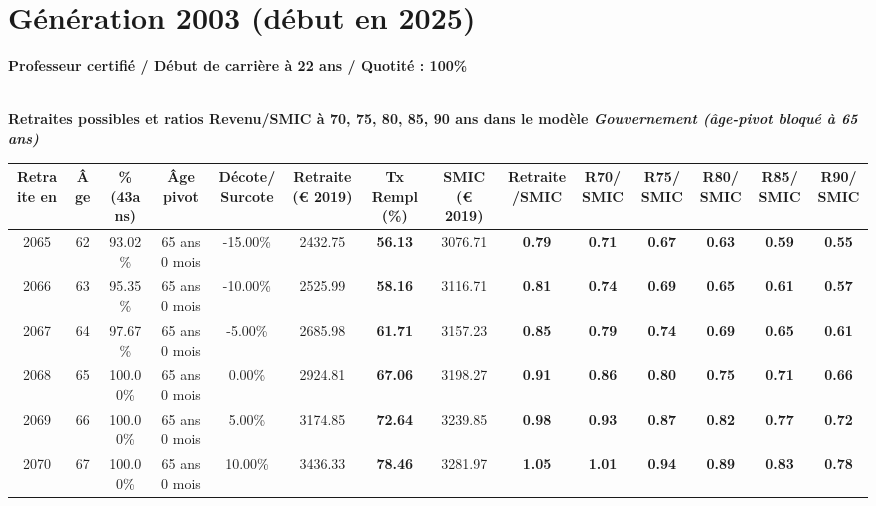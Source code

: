 \newpage 
 
\section{Génération 2003 (début en 2025)\label{ProfCertifie_100_2003_22_0}} 
 
{\bf \noindent Professeur certifié / Début de carrière à 22 ans / Quotité : 100\%}  ~ 

 ~\\{\bf \noindent Retraites possibles et ratios Revenu/SMIC à 70, 75, 80, 85, 90 ans dans le modèle \emph{Gouvernement (âge-pivot bloqué à 65 ans)}}  
 
\begin{adjustbox}{max width=\textwidth} 
\begin{tabular}[htb]{|c|c||c|c|c||c|c||c|c||c|c|c|c|c|} 
\hline 
 Retraite en &  Âge &  \%(43ans) &  Âge pivot &  Décote/Surcote &  Retraite (\euro{} 2019) &  Tx Rempl(\%) &  SMIC (\euro{} 2019) &  Retraite/SMIC &  R70/SMIC &  R75/SMIC &  R80/SMIC &  R85/SMIC &  R90/SMIC \\ 
\hline \hline 
 2065 &  62 &  93.02\% &  65 ans 0 mois &  -15.00\% &  2432.75 &  {\bf 56.13} &  3076.71 &  {\bf {\color{red} 0.79}} &  {\bf {\color{red} 0.71}} &  {\bf {\color{red} 0.67}} &  {\bf {\color{red} 0.63}} &  {\bf {\color{red} 0.59}} &  {\bf {\color{red} 0.55}} \\ 
\hline 
 2066 &  63 &  95.35\% &  65 ans 0 mois &  -10.00\% &  2525.99 &  {\bf 58.16} &  3116.71 &  {\bf {\color{red} 0.81}} &  {\bf {\color{red} 0.74}} &  {\bf {\color{red} 0.69}} &  {\bf {\color{red} 0.65}} &  {\bf {\color{red} 0.61}} &  {\bf {\color{red} 0.57}} \\ 
\hline 
 2067 &  64 &  97.67\% &  65 ans 0 mois &  -5.00\% &  2685.98 &  {\bf 61.71} &  3157.23 &  {\bf {\color{red} 0.85}} &  {\bf {\color{red} 0.79}} &  {\bf {\color{red} 0.74}} &  {\bf {\color{red} 0.69}} &  {\bf {\color{red} 0.65}} &  {\bf {\color{red} 0.61}} \\ 
\hline 
 2068 &  65 &  100.00\% &  65 ans 0 mois &  0.00\% &  2924.81 &  {\bf 67.06} &  3198.27 &  {\bf {\color{red} 0.91}} &  {\bf {\color{red} 0.86}} &  {\bf {\color{red} 0.80}} &  {\bf {\color{red} 0.75}} &  {\bf {\color{red} 0.71}} &  {\bf {\color{red} 0.66}} \\ 
\hline 
 2069 &  66 &  100.00\% &  65 ans 0 mois &  5.00\% &  3174.85 &  {\bf 72.64} &  3239.85 &  {\bf {\color{red} 0.98}} &  {\bf {\color{red} 0.93}} &  {\bf {\color{red} 0.87}} &  {\bf {\color{red} 0.82}} &  {\bf {\color{red} 0.77}} &  {\bf {\color{red} 0.72}} \\ 
\hline 
 2070 &  67 &  100.00\% &  65 ans 0 mois &  10.00\% &  3436.33 &  {\bf 78.46} &  3281.97 &  {\bf 1.05} &  {\bf 1.01} &  {\bf {\color{red} 0.94}} &  {\bf {\color{red} 0.89}} &  {\bf {\color{red} 0.83}} &  {\bf {\color{red} 0.78}} \\ 
\hline 
\hline 
\end{tabular} 
\end{adjustbox} 
 
